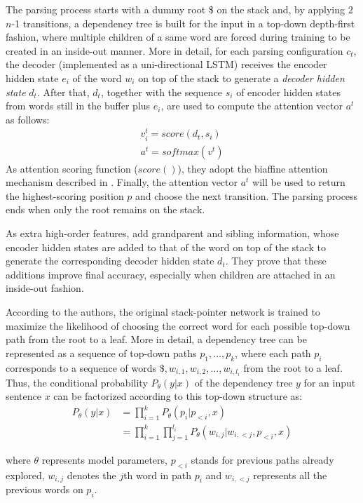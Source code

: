 \documentclass[11pt,a4paper]{article}
\begin{document}
\noindent The parsing process starts with a dummy root \$ on 
the stack and, by applying 2$n$-1 transitions, a dependency tree is built for the input 
in a top-down depth-first fashion, where multiple children of a same word are forced during training to be created in an inside-out manner. More in detail, for each parsing configuration $c_t$, the decoder (implemented as a uni-directional LSTM) receives the encoder hidden state $e_i$ of the word $w_i$ on top of the stack to generate a \textit{decoder hidden state} $d_t$. After that, $d_t$, together with the sequence $s_i$ of encoder hidden states from words still in the buffer plus $e_i$, are used to compute the attention vector $a^t$ as follows: 
\begin{align}
v^t_i = score(d_t, s_i)\\
a^t = softmax(v^t)
\end{align}
As attention scoring function ($score()$), they adopt the biaffine attention mechanism described in \cite{Luong2015, DozatM16}. Finally, the attention vector $a^t$ will be used to return the highest-scoring position $p$
and choose the next transition. 
The parsing process ends when 
only the root remains on the stack.

As extra high-order features, \citet{Ma18} add grandparent and sibling information, 
whose encoder hidden states are added to that of the word on top of the stack to generate the corresponding decoder hidden state $d_t$.
They prove that these additions improve final accuracy, especially when children are attached in an inside-out fashion.

According to the authors, the original stack-pointer network is trained to maximize the likelihood of choosing the correct word for each possible top-down path from the root to 
a leaf.
More in detail, a dependency tree can be represented as a sequence of top-down paths $p_1, \dots , p_k$, where each path $p_i$ corresponds to a sequence of words $\$, w_{i,1}, w_{i,2}, \dots, w_{i,l_i}$ from the root to a leaf. Thus, the conditional probability $P_\theta (y|x)$ of the dependency tree $y$ for an input sentence $x$ can be factorized according to this top-down structure as:
\begin{align*}
P_\theta (y|x) &= \prod_{i=1}^k P_\theta (p_i | p_{<i}, x) \\
&= \prod_{i=1}^k \prod_{j=1}^{l_i} P_\theta (w_{i,j} | w_{i,<j},p_{<i},x) 
\end{align*}

\noindent where $\theta$ represents model parameters, $p_{<i}$ stands for previous paths already explored, $w_{i,j}$ denotes the $j$th word in path $p_i$ and $w_{i,<j}$ represents all the previous words on $p_i$. 
\end{document}
